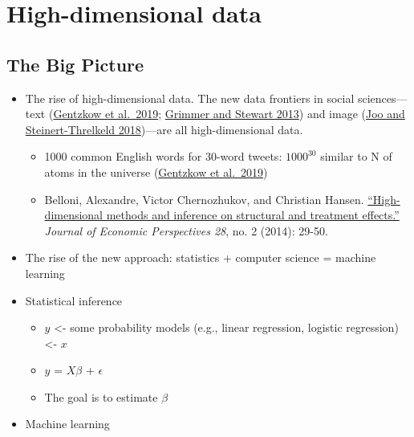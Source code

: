 \documentclass[
]{book}
\begin{document}
\chapter{High-dimensional data}\label{machine_learning}

\section{The Big Picture}\label{the-big-picture-9}

\begin{itemize}
\item
  The rise of high-dimensional data. The new data frontiers in social sciences---text (\href{https://web.stanford.edu/~gentzkow/research/text-as-data.pdf}{Gentzkow et al.~2019}; \href{https://www.jstor.org/stable/pdf/24572662.pdf?casa_token=SQdSI4R_VdwAAAAA:4QiVLhCXqr9f0qNMM9U75EL5JbDxxnXxUxyIfDf0U8ZzQx9szc0xVqaU6DXG4nHyZiNkvcwGlgD6H0Lxj3y0ULHwgkf1MZt8-9TPVtkEH9I4AHgbTg}{Grimmer and Stewart 2013}) and image (\href{https://arxiv.org/pdf/1810.01544}{Joo and Steinert-Threlkeld 2018})---are all high-dimensional data.

  \begin{itemize}
  \item
    1000 common English words for 30-word tweets: \(1000^{30}\) similar to N of atoms in the universe (\href{https://web.stanford.edu/~gentzkow/research/text-as-data.pdf}{Gentzkow et al.~2019})
  \item
    Belloni, Alexandre, Victor Chernozhukov, and Christian Hansen. \href{https://pubs.aeaweb.org/doi/pdfplus/10.1257/jep.28.2.29}{``High-dimensional methods and inference on structural and treatment effects.''} \emph{Journal of Economic Perspectives 28}, no. 2 (2014): 29-50.
  \end{itemize}
\item
  The rise of the new approach: statistics + computer science = machine learning
\item
  Statistical inference

  \begin{itemize}
  \item
    \(y\) \textless- some probability models (e.g., linear regression, logistic regression) \textless- \(x\)
  \item
    \(y\) = \(X\beta\) + \(\epsilon\)
  \item
    The goal is to estimate \(\beta\)
  \end{itemize}
\item
  Machine learning


\end{itemize}
\end{document}
